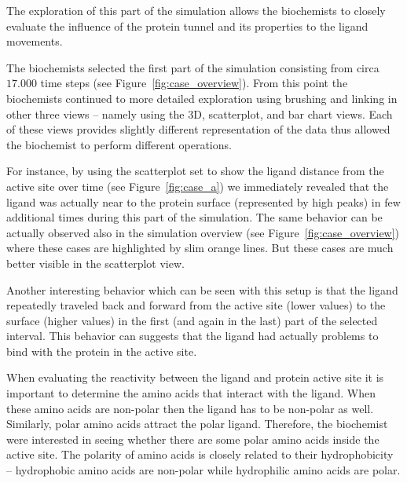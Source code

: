 \documentclass[twocolumn]{bmcart}%
\begin{document}
The exploration of this part of the simulation allows the biochemists to closely evaluate the influence of the protein tunnel and its properties to the ligand movements.

The biochemists selected the first part of the simulation consisting from circa $17.000$ time steps (see Figure~\ref{fig:case_overview}). 
From this point the biochemists continued to more detailed exploration using brushing and linking in other three views -- namely using the 3D, scatterplot, and bar chart views.
Each of these views provides slightly different representation of the data thus allowed the biochemist to perform different operations.

For instance, by using the scatterplot set to show the ligand distance from the active site over time (see Figure~\ref{fig:case_a}) we immediately revealed that the ligand was actually near to the protein surface (represented by high peaks) in few additional times during this part of the simulation.
The same behavior can be actually observed also in the simulation overview (see Figure~\ref{fig:case_overview}) where these cases are highlighted by slim orange lines. 
But these cases are much better visible in the scatterplot view.

Another interesting behavior which can be seen with this setup is that the ligand repeatedly traveled back and forward from the active site (lower values) to the surface (higher values) in the first (and again in the last) part of the selected interval.
This behavior can suggests that the ligand had actually problems to bind with the protein in the active site.

 
 


When evaluating the reactivity between the ligand and protein active site it is important to determine the amino acids that interact with the ligand. 
When these amino acids are non-polar then the ligand has to be non-polar as well.
Similarly, polar amino acids attract the polar ligand.
Therefore, the biochemist were interested in seeing whether there are some polar amino acids inside the active site.
The polarity of amino acids is closely related to their hydrophobicity -- hydrophobic amino acids are non-polar while hydrophilic amino acids are polar. 
\end{document}
